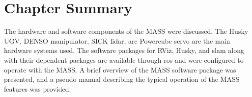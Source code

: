 \section{Chapter Summary}

The hardware and software components of the MASS were discussed. The Husky UGV, DENSO manipulator, SICK \acrshort{lidar}, are Powercube servo are the main hardware systems used. The software packages for RViz, Husky, and \acrshort{slam} along with their dependent packages are available through \acrshort{ros} and were configured to operate with the MASS. A brief overview of the MASS software package was presented, and a pseudo manual describing the typical operation of the MASS features was provided.\\
